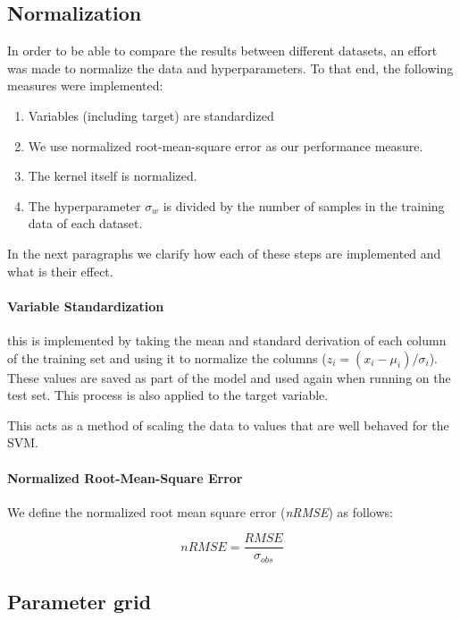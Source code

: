 \subsection{Normalization}

In order to be able to compare the results between different datasets, an effort
was made to normalize the data and hyperparameters. To that end, the
following measures were implemented:

\begin{enumerate}
    \item Variables (including target) are standardized
    \item We use normalized root-mean-square error as our performance
        measure.
    \item The kernel itself is normalized.
    \item The hyperparameter $\sigma_w$ is divided by the number of samples in
        the training data of each dataset.
\end{enumerate}

In the next paragraphs we clarify how each of these steps are implemented and
what is their effect.

\paragraph{Variable Standardization} this is implemented by taking the mean and
standard derivation of each column of the training set and using it to
normalize the columns ($z_i = (x_i - \mu_i)/\sigma_i$). These values are saved as
part of the model and used again when running on the test set. This process
is also applied to the target variable.

This acts as a method of scaling the data to values that are well behaved
for the SVM.

\paragraph{Normalized Root-Mean-Square Error} We define the
normalized root mean square error (\emph{nRMSE}) as follows:

\begin{equation}
    nRMSE = \frac{RMSE}{\sigma_{obs}}
\end{equation}

\subsection{Parameter grid}

